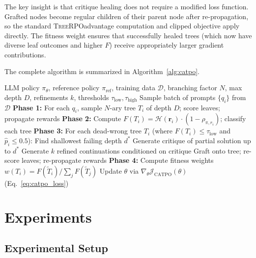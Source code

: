 \documentclass{article} %
\newcommand{\CATPO}{\textsc{CATPO}}
\newcommand{\TreeRPO}{\textsc{TreeRPO}}
\begin{document}
The key insight is that critique healing does not require a modified loss function. Grafted nodes become regular children of their parent node after re-propagation, so the standard \TreeRPO advantage computation and clipped objective apply directly. The fitness weight ensures that successfully healed trees (which now have diverse leaf outcomes and higher $F$) receive appropriately larger gradient contributions.

The complete algorithm is summarized in Algorithm~\ref{alg:catpo}.

\begin{algorithm}[t]
\caption{\CATPO: Critique-Augmented Tree Policy Optimization}
\label{alg:catpo}
\begin{algorithmic}[1]
\REQUIRE LLM policy $\pi_\theta$, reference policy $\pi_\text{ref}$, training data $\mathcal{D}$, branching factor $N$, max depth $D$, refinements $k$, thresholds $\tau_\text{low}, \tau_\text{high}$
    \STATE Sample batch of prompts $\{q_i\}$ from $\mathcal{D}$
    \STATE \textbf{Phase 1:} For each $q_i$, sample $N$-ary tree $T_i$ of depth $D$; score leaves; propagate rewards
    \STATE \textbf{Phase 2:} Compute $F(T_i) = \mathcal{H}(\mathbf{r}_i) \cdot (1 - \rho_{\pi,r_i})$; classify each tree
    \STATE \textbf{Phase 3:} For each dead-wrong tree $T_i$ (where $F(T_i) \le \tau_\text{low}$ and $\hat{p}_i \le 0.5$):
    \STATE \quad Find shallowest failing depth $d^*$
    \STATE \quad Generate critique of partial solution up to $d^*$
    \STATE \quad Generate $k$ refined continuations conditioned on critique
    \STATE \quad Graft onto tree; re-score leaves; re-propagate rewards
    \STATE \textbf{Phase 4:} Compute fitness weights $w(T_i) = F(\tilde{T}_i) / \sum_j F(\tilde{T}_j)$
    \STATE Update $\theta$ via $\nabla_\theta \mathcal{J}_\text{CATPO}(\theta)$ \hfill (Eq.~\ref{eq:catpo_loss})
\ENDFOR
\end{algorithmic}
\end{algorithm}


\section{Experiments}
\label{sec:experiments}

\subsection{Experimental Setup}
\end{document}
